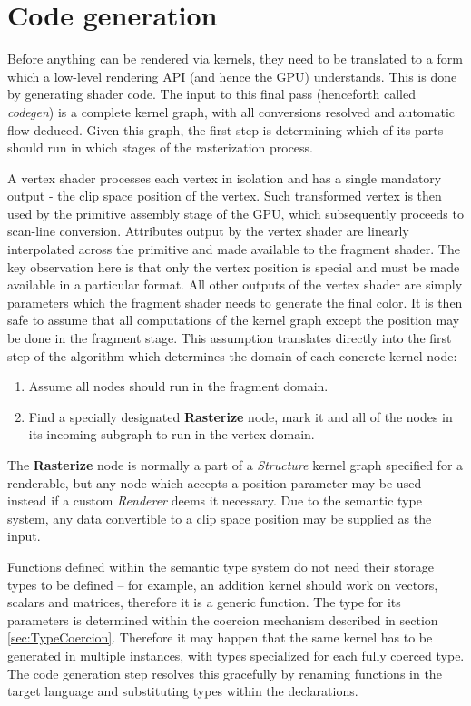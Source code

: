 \section{Code generation}
\label{sec:codegen}

Before anything can be rendered via kernels, they need to be translated to a form which a low-level rendering API (and hence the GPU) understands. This is done by generating shader code. The input to this final pass (henceforth called \emph{codegen}) is a complete kernel graph, with all conversions resolved and automatic flow deduced. Given this graph, the first step is determining which of its parts should run in which stages of the rasterization process.

A vertex shader processes each vertex in isolation and has a single mandatory output - the clip space position of the vertex. Such transformed vertex is then used by the primitive assembly stage of the GPU, which subsequently proceeds to scan-line conversion. Attributes output by the vertex shader are linearly interpolated across the primitive and made available to the fragment shader. The key observation here is that only the vertex position is special and must be made available in a particular format. All other outputs of the vertex shader are simply parameters which the fragment shader needs to generate the final color. It is then safe to assume that all computations of the kernel graph except the position may be done in the fragment stage. This assumption translates directly into the first step of the algorithm which determines the domain of each concrete kernel node:

\begin{enumerate}
\item Assume all nodes should run in the fragment domain.
\item Find a specially designated \textbf{Rasterize} node, mark it and all of the nodes in its incoming subgraph to run in the vertex domain.
\end{enumerate}

The \textbf{Rasterize} node is normally a part of a \emph{Structure} kernel graph specified for a renderable, but any node which accepts a position parameter may be used instead if a custom \emph{Renderer} deems it necessary. Due to the semantic type system, any data convertible to a clip space position may be supplied as the input.

Functions defined within the semantic type system do not need their storage types to be defined -- for example, an addition kernel should work on vectors, scalars and matrices, therefore it is a generic function. The type for its parameters is determined within the coercion mechanism described in section \ref{sec:TypeCoercion}. Therefore it may happen that the same kernel has to be generated in multiple instances, with types specialized for each fully coerced type. The code generation step resolves this gracefully by renaming functions in the target language and substituting types within the declarations.

